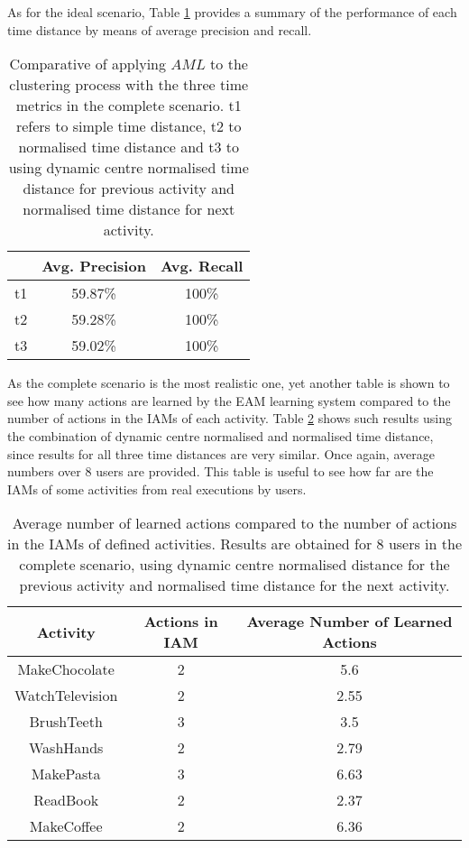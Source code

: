 As for the ideal scenario, Table \ref{tab-aml-comparative-complete} provides a summary of the performance of each time distance by means of average precision and recall. 

\begin{table}[htbp]\scriptsize
\begin{center}
 \begin{tabular}{ccc}
  \hline
   & Avg. Precision & Avg. Recall \\
  \hline
  t1 & 59.87\% & 100\% \\
  t2 & 59.28\% & 100\% \\
  t3 & 59.02\% & 100\% \\
  \hline
 \end{tabular}
 \caption{Comparative of applying $AML$ to the clustering process with the three time metrics in the complete scenario. t1 refers to simple time distance, t2 to normalised time distance and t3 to using dynamic centre normalised time distance for previous activity and normalised time distance for next activity.}
 \label{tab-aml-comparative-complete}
\end{center} 
\end{table}

As the complete scenario is the most realistic one, yet another table is shown to see how many actions are learned by the EAM learning system compared to the number of actions in the IAMs of each activity. Table \ref{tab-avg-actions-comp-t2} shows such results using the combination of dynamic centre normalised and normalised time distance, since results for all three time distances are very similar. Once again, average numbers over 8 users are provided. This table is useful to see how far are the IAMs of some activities from real executions by users.


\begin{table}[htbp]\scriptsize
  \begin{center}
        \begin{tabular}{ccc}
            \hline            
            \textbf{Activity} & \textbf{Actions in IAM} & \textbf{Average Number of Learned Actions} \\             
            \hline
            MakeChocolate   & 2 & 5.6 \\
	    WatchTelevision & 2 & 2.55 \\
	    BrushTeeth      & 3 & 3.5 \\
	    WashHands       & 2 & 2.79 \\
	    MakePasta       & 3 & 6.63 \\
	    ReadBook        & 2 & 2.37 \\
	    MakeCoffee      & 2 & 6.36 \\
            \hline
        \end{tabular}                
        \caption{Average number of learned actions compared to the number of actions in the IAMs of defined activities. Results are obtained for 8 users in the complete scenario, using dynamic centre normalised distance for the previous activity and normalised time distance for the next activity.}
        \label{tab-avg-actions-comp-t2}
    \end{center}
\end{table}

